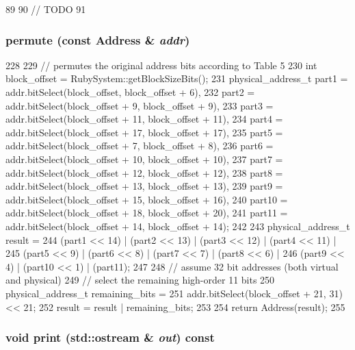 \begin{DoxyCode}
89 {
90     // TODO
91 }
\end{DoxyCode}
\hypertarget{classBulkBloomFilter_a63252da8c7a655ee605b6bfeebf04b40}{
\subsubsection[{permute}]{ permute (const {\bf Address} \& {\em addr})}}
\label{classBulkBloomFilter_a63252da8c7a655ee605b6bfeebf04b40}



\begin{DoxyCode}
228 {
229     // permutes the original address bits according to Table 5
230     int block_offset = RubySystem::getBlockSizeBits();
231     physical_address_t part1 = addr.bitSelect(block_offset, block_offset + 6),
232         part2 = addr.bitSelect(block_offset + 9, block_offset + 9),
233         part3 = addr.bitSelect(block_offset + 11, block_offset + 11),
234         part4 = addr.bitSelect(block_offset + 17, block_offset + 17),
235         part5 = addr.bitSelect(block_offset + 7, block_offset + 8),
236         part6 = addr.bitSelect(block_offset + 10, block_offset + 10),
237         part7 = addr.bitSelect(block_offset + 12, block_offset + 12),
238         part8 = addr.bitSelect(block_offset + 13, block_offset + 13),
239         part9 = addr.bitSelect(block_offset + 15, block_offset + 16),
240         part10 = addr.bitSelect(block_offset + 18, block_offset + 20),
241         part11 = addr.bitSelect(block_offset + 14, block_offset + 14);
242 
243     physical_address_t result =
244         (part1 << 14) | (part2 << 13) | (part3 << 12) | (part4 << 11) |
245         (part5 << 9)  | (part6 << 8)  | (part7 << 7)  | (part8 << 6)  |
246         (part9 << 4)  | (part10 << 1) | (part11);
247 
248     // assume 32 bit addresses (both virtual and physical)
249     // select the remaining high-order 11 bits
250     physical_address_t remaining_bits =
251         addr.bitSelect(block_offset + 21, 31) << 21;
252     result = result | remaining_bits;
253 
254     return Address(result);
255 }
\end{DoxyCode}
\hypertarget{classBulkBloomFilter_ac55fe386a101fbae38c716067c9966a0}{
\subsubsection[{print}]{\setlength{\rightskip}{0pt plus 5cm}void print (std::ostream \& {\em out}) const}}
\label{classBulkBloomFilter_ac55fe386a101fbae38c716067c9966a0}


